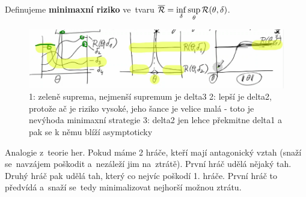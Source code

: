 \begin{define}
	Definujeme \textbf{minimaxní riziko} ve~tvaru $\overline{\mathcal{R}}=\inf\limits_\delta\sup\limits_\theta\mathcal{R}(\theta,\delta)$.
\end{define}
\newpage
\begin{figure}[h]
	\centering
	\includegraphics[width=0.95\linewidth]{pictures/P4_3}
	\caption{1: zeleně suprema, nejmenší supremum je delta3 2: lepší je delta2, protože ač je riziko vysoké, jeho šance je velice malá - toto je nevýhoda minimaxní strategie 3: delta2 jen lehce překmitne delta1 a pak se k němu blíží asymptoticky}
	\label{fig:p43}
\end{figure}



\begin{remark}
	Analogie z~teorie her. Pokud máme 2 hráče, kteří mají antagonický vztah (snaží se~navzájem poškodit a~nezáleží jim na~ztrátě). První hráč udělá nějaký tah. Druhý hráč pak udělá tah, který co nejvíc poškodí 1. hráče. První hráč to předvídá a~snaží se~tedy minimalizovat nejhorší možnou ztrátu.
\end{remark}

